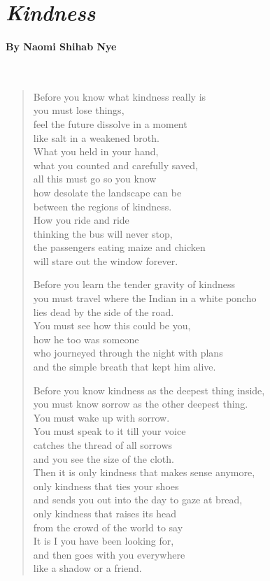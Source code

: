 \documentclass[12pt, openany, letterpaper]{memoir}
\begin{document}
\newpage
\section*{\emph{Kindness}}
\paragraph{By Naomi Shihab Nye}~
\begin{verse}
	Before you know what kindness really is\\
	you must lose things,\\
	feel the future dissolve in a moment\\
	like salt in a weakened broth.\\
	What you held in your hand,\\
	what you counted and carefully saved,\\
	all this must go so you know\\
	how desolate the landscape can be\\
	between the regions of kindness.\\
	How you ride and ride\\
	thinking the bus will never stop,\\
	the passengers eating maize and chicken\\
	will stare out the window forever.
	
	Before you learn the tender gravity of kindness\\
	you must travel where the Indian in a white poncho\\
	lies dead by the side of the road.\\
	You must see how this could be you,\\
	how he too was someone\\
	who journeyed through the night with plans\\
	and the simple breath that kept him alive.
	
	Before you know kindness as the deepest thing inside,\\
	you must know sorrow as the other deepest thing.\\
	You must wake up with sorrow.\\
	You must speak to it till your voice\\
	catches the thread of all sorrows\\
	and you see the size of the cloth.\\
	Then it is only kindness that makes sense anymore,\\
	only kindness that ties your shoes\\
	and sends you out into the day to gaze at bread,\\
	only kindness that raises its head\\
	from the crowd of the world to say\\
	It is I you have been looking for,\\
	and then goes with you everywhere\\
	like a shadow or a friend.	
\end{verse}
\end{document}
